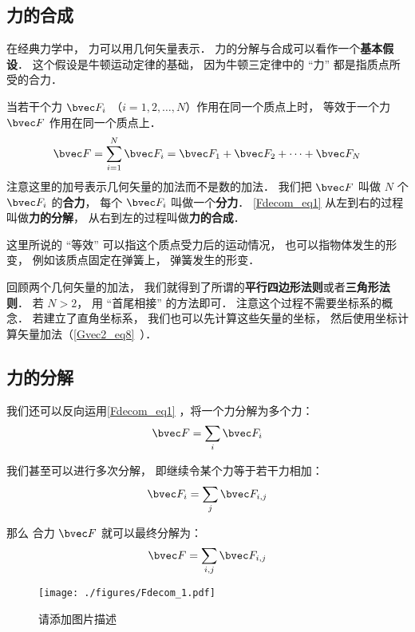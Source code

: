 

\subsection{力的合成}
在经典力学中， 力可以用几何矢量表示． 力的分解与合成可以看作一个\textbf{基本假设}． 这个假设是牛顿运动定律的基础， 因为牛顿三定律中的 “力” 都是指质点所受的合力．

当若干个力 $\bvec F_i$ （$i = 1, 2, \dots, N$）作用在同一个质点上时， 等效于一个力 $\bvec F$ 作用在同一个质点上．
\begin{equation}\label{Fdecom_eq1}
\bvec F = \sum_{i=1}^N \bvec F_i = \bvec F_1 + \bvec F_2 + \dots + \bvec F_N
\end{equation}
注意这里的加号表示几何矢量的加法而不是数的加法． 我们把 $\bvec F$ 叫做 $N$ 个 $\bvec F_i$ 的\textbf{合力}， 每个 $\bvec F_i$ 叫做一个\textbf{分力}． \autoref{Fdecom_eq1} 从左到右的过程叫做\textbf{力的分解}， 从右到左的过程叫做\textbf{力的合成}．

这里所说的 “等效” 可以指这个质点受力后的运动情况， 也可以指物体发生的形变， 例如该质点固定在弹簧上， 弹簧发生的形变．

回顾两个几何矢量的加法， 我们就得到了所谓的\textbf{平行四边形法则}或者\textbf{三角形法则}． 若 $N > 2$， 用 “首尾相接” 的方法即可． 注意这个过程不需要坐标系的概念． 若建立了直角坐标系， 我们也可以先计算这些矢量的坐标， 然后使用坐标计算矢量加法（\autoref{Gvec2_eq8}~）．

\subsection{力的分解}
我们还可以反向运用\autoref{Fdecom_eq1} ，将一个力分解为多个力：
\begin{equation}
\bvec F = \sum_i \bvec F_{i}
\end{equation}

我们甚至可以进行多次分解， 即继续令某个力等于若干力相加：
\begin{equation}
\bvec F_i = \sum_j \bvec F_{i,j}
\end{equation}

那么 合力 $\bvec F$ 就可以最终分解为：
\begin{equation}
\bvec F = \sum_{i,j} \bvec F_{i,j}
\end{equation}

\begin{figure}[ht]
\centering
\texttt{[image: ./figures/Fdecom\_1.pdf]}
\caption{请添加图片描述} \label{Fdecom_fig1}
\end{figure}

